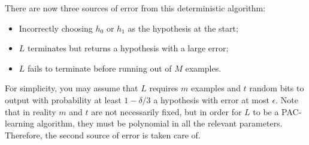 \documentclass[11pt]{article}
\DeclareMathOperator{\1}{\mathbbm{1}}
\begin{document}
\begin{problem}
There are now three sources of error from this deterministic algorithm:
\begin{itemize}
\item Incorrectly choosing $h_0$ or $h_1$ as the hypothesis at the start;
\item $L$ terminates but returns a hypothesis with a large error;
\item $L$ fails to terminate before running out of $M$ examples. 
\end{itemize}

For simplicity, you may assume that $L$ requires $m$ examples and $t$ random bits
to output with probability at least $1-\delta/3$ a hypothesis with error at most
$\epsilon$. Note that in reality $m$ and $t$ are not necessarily fixed, but in order for $L$ 
to be a PAC-learning algorithm, they must be polynomial in all the relevant parameters.
Therefore, the second source of error is taken care of. 


\end{problem}
\end{document}
